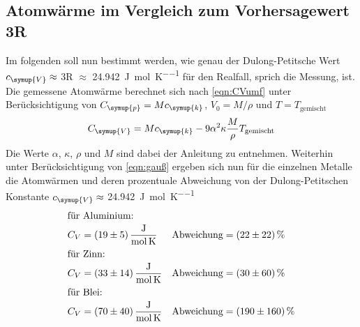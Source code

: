 \subsection{Atomwärme im Vergleich zum Vorhersagewert 3R}
Im folgenden soll nun bestimmt werden, wie genau der Dulong-Petitsche
Wert $c_\symup{V}\approx$ 3R $\approx$ \SI{24,942}{\joule\per\mol\per\kelvin}
für den Realfall, sprich die Messung, ist. Die gemessene Atomwärme
berechnet sich nach \eqref{eqn:CVumf} unter Berücksichtigung von
$C_\symup{p}=Mc_\symup{k}$, $V_0 = M/\rho$ und $T=T_\text{gemischt}$
\begin{equation}
  C_\symup{V}=Mc_\symup{k}-9\alpha^2\kappa\frac{M}{\rho}T_\text{gemischt}
  \label{eqn:CV}
\end{equation}
Die Werte $\alpha$, $\kappa$, $\rho$ und $M$ sind dabei der
Anleitung zu entnehmen. Weiterhin unter Berücksichtigung von \eqref{eqn:gauß}
ergeben sich nun für die einzelnen Metalle die Atomwärmen und deren
prozentuale Abweichung von der Dulong-Petitschen Konstante
$c_\symup{V}\approx$ \SI{24,942}{\joule\per\mol\per\kelvin}
\begin{align*}
  \intertext{für Aluminium:}
  C_V&=\SI{19(5)}{\joule\per\mol\per\kelvin}&
  \text{Abweichung}&=\SI{22(22)}{\percent}\\
  \intertext{für Zinn:}
  C_V&=\SI{33(14)}{\joule\per\mol\per\kelvin}&
  \text{Abweichung}&=\SI{30(60)}{\percent}\\
  \intertext{für Blei:}
  C_V&=\SI{70(40)}{\joule\per\mol\per\kelvin}&
  \text{Abweichung}&=\SI{190(160)}{\percent}
\end{align*}
